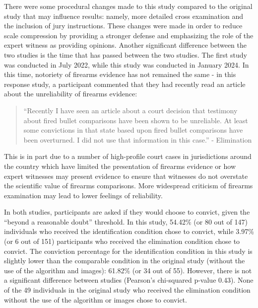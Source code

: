 \documentclass[print]{nuthesis}
\begin{document}
There were some procedural changes made to this study compared to the original study that may influence results: namely, more detailed cross examination and the inclusion of jury instructions.
These changes were made in order to reduce scale compression by providing a stronger defense and emphasizing the role of the expert witness as providing opinions.
Another significant difference between the two studies is the time that has passed between the two studies.
The first study was conducted in July 2022, while this study was conducted in January 2024.
In this time, notoriety of firearms evidence has not remained the same - in this response study, a participant commented that they had recently read an article about the unreliability of firearms evidence:

\begin{quote}
``Recently I have seen an article about a court decision that testimony about fired bullet comparisons have been shown to be unreliable. At least some convictions in that state based upon fired bullet comparisons have been overturned. I did not use that information in this case.'' - Elimination
\end{quote}

This is in part due to a number of high-profile court cases in jurisdictions around the country which have limited the presentation of firearms evidence or how expert witnesses may present evidence to ensure that witnesses do not overstate the scientific value of firearms comparisons.
More widespread criticism of firearms examination may lead to lower feelings of reliability.

In both studies, participants are asked if they would choose to convict, given the ``beyond a reasonable doubt'' threshold.
In this study, 54.42\% (or 80 out of 147) individuals who received the identification condition chose to convict, while 3.97\% (or 6 out of 151) participants who received the elimination condition chose to convict.
The conviction percentage for the identification condition in this study is slightly lower than the comparable condition in the original study (without the use of the algorithm and images): 61.82\% (or 34 out of 55).
However, there is not a significant difference between studies (Pearson's chi-squared p-value 0.43).
None of the 49 individuals in the original study who received the elimination condition without the use of the algorithm or images chose to convict.
\end{document}
